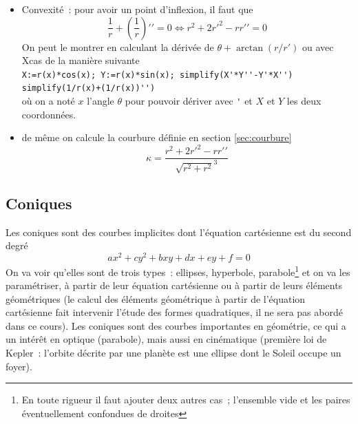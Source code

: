 \documentclass[a4paper,11pt]{article}
\begin{document}
\begin{itemize}
a la m\^eme allure que pour un point r\'egulier, si $r$ ne change pas
de signe on a un rebroussement de premi\`ere esp\`ece (puisqu'on
traverse la tangente lorsque $\theta$ augmente)
\item Convexité~:  pour avoir un point d'inflexion, il faut que 
$$\frac1r + \left(\frac1r\right)'{'}=0
\Leftrightarrow
r^2+2r'^2-rr'{'}=0
$$
On peut le montrer en calculant la d\'eriv\'ee de
$\theta+\arctan(r/r')$ 
ou avec Xcas de la manière suivante\\
\verb|X:=r(x)*cos(x); Y:=r(x)*sin(x); simplify(X'*Y''-Y'*X'')|\\
\verb|simplify(1/r(x)+(1/r(x))'')|\\
où on a noté $x$ l'angle $\theta$ pour pouvoir dériver avec \verb|'|
et $X$ et $Y$ les deux coordonnées.
\item de même on calcule la courbure d\'efinie en section \ref{sec:courbure}
$$ \kappa = \frac{r^2+2r'^2-rr'{'}}{\sqrt{r^2+r^2}^3}$$
\end{itemize}

\subsection{Coniques}
Les coniques sont des courbes implicites dont l'\'equation
cart\'esienne est du second degr\'e~
$$ax^2+cy^2+bxy+dx+ey+f=0$$
On va voir qu'elles sont de trois types~: ellipses, hyperbole,
parabole\footnote{En toute rigueur il faut ajouter deux autres cas~;
l'ensemble vide et les paires \'eventuellement confondues de droites} 
et on va les param\'etriser, \`a partir de leur \'equation
cart\'esienne ou \`a partir de leurs \'el\'ements g\'eom\'etriques
(le calcul des \'el\'ements g\'eom\'etrique \`a partir de l'\'equation
cart\'esienne fait intervenir l'\'etude des formes quadratiques, il ne
sera pas abord\'e dans ce cours).
Les coniques sont des courbes importantes en g\'eom\'etrie, 
ce qui a un int\'er\^et en optique 
(parabole), mais aussi en cin\'ematique (premi\`ere loi de Kepler~:
l'orbite d\'ecrite par une plan\`ete est une ellipse dont
le Soleil occupe un foyer).
\end{document}
